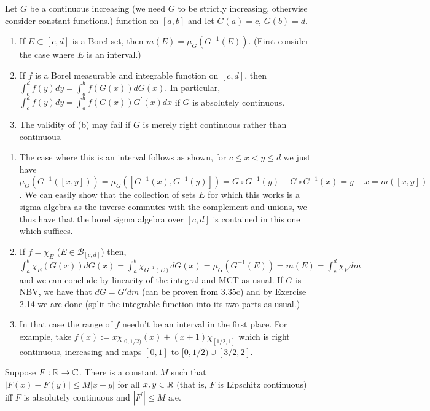 \documentclass[12pt,a4paper]{article}
\begin{document}
\begin{problem}\label{prob:3-36}
Let $G$ be a continuous increasing (we need $G$ to be strictly increasing, otherwise consider constant functions.) function on $[a, b]$ and let $G(a)=c$, $G(b)=d.$
\begin{enumerate}[label=\alph*.]
    \item If $E\subset[c,d]$ is a Borel set, then $m(E)=\mu_{G}(G^{-1}(E)).$ (First consider the case where $E$ is an interval.)
    \item If $f$ is a Borel measurable and integrable function on $[c, d]$, then $\int_{c}^{d}f(y)dy=\int_{a}^{b}f(G(x))dG(x)$. In particular, $\int_{c}^{d}f(y)dy=\int_{a}^{b}f(G(x))G^{\prime}(x)dx$ if $G$ is absolutely continuous.
    \item The validity of (b) may fail if $G$ is merely right continuous rather than continuous.
\end{enumerate}
\end{problem}
\begin{solution}
\begin{enumerate}[label=\alph*.]
    \item The case where this is an interval follows as shown, for $c\leq x<y\leq d$ we just have $\mu_G(G^{-1}([x,y]))=\mu_G([G^{-1}(x),G^{-1}(y)])=G\circ G^{-1}(y)-G\circ G^{-1}(x)=y-x=m([x,y])$. 
        We can easily show that the collection of sets $E$ for which this works is a sigma algebra as the inverse commutes with the complement and unions, we thus have that the borel sigma algebra over $[c,d]$ is contained in this one which suffices.
    \item If $f=\chi_E$ ($E\in\mathcal B_{[c,d]}$) then, $\int_a^b\chi_E(G(x))dG(x)=\int_a^b\chi_{G^{-1}(E)}dG(x)=\mu_G(G^{-1}(E))=m(E)=\int_c^d\chi_Edm$ and we can conclude by linearity of the integral and MCT as usual. 
       If $G$ is NBV, we have that $dG=G'dm$ (can be proven from 3.35c) and by \hyperref[prob:2-14]{Exercise 2.14} we are done (split the integrable function into its two parts as usual.)
   \item In that case the range of $f$ needn't be an interval in the first place. 
       For example, take $f(x):=x\chi_{[0,1/2)}(x)+(x+1)\chi_{[1/2,1]}$ which is right continuous, increasing and maps $[0,1]$ to $[0,1/2)\cup[3/2,2].$
\end{enumerate}
\end{solution}
\begin{problem}\label{prob:3-37}
Suppose $F:\mathbb{R}\rightarrow\mathbb{C}$. There is a constant $M$ such that $|F(x)-F(y)|\le M|x-y|$ for all $x,y\in\mathbb{R}$ (that is, $F$ is Lipschitz continuous) iff $F$ is absolutely continuous and $|F^{\prime}|\le M$ a.e.
\end{problem}
\end{document}

